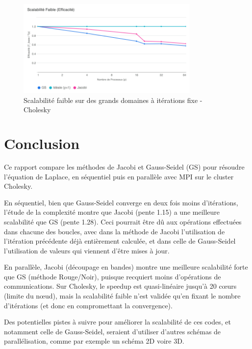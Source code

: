 \documentclass{article}
\begin{document}
\begin{figure}[H]
    \centering
    \includegraphics[width=0.8\textwidth]{Scalabilité_Faible_Efficacité_It}
    \caption{Scalabilité faible sur des grands domaines à itérations fixe - Cholesky}
    \label{fig:weakCholeskyBigIt}
\end{figure}

\section*{Conclusion}

Ce rapport compare les méthodes de Jacobi et Gauss-Seidel (GS) pour résoudre l'équation de Laplace, en séquentiel puis en parallèle avec MPI sur le cluster Cholesky.

En séquentiel, bien que Gauss-Seidel converge en deux fois moins d'itérations, l'étude de la complexité montre que Jacobi (pente 1.15) a une meilleure scalabilité que GS (pente 1.28). Ceci pourrait être dû aux opérations effectuées dans chacune des boucles, avec dans la méthode de Jacobi l'utilisation de l'itération précédente déjà entièrement calculée, et dans celle de Gauss-Seidel l'utilisation de valeurs qui viennent d'être mises à jour.

En parallèle, Jacobi (découpage en bandes) montre une meilleure scalabilité forte que GS (méthode Rouge/Noir), puisque recquiert moins d'opérations de communications. Sur Cholesky, le speedup est quasi-linéaire jusqu'à 20 cœurs (limite du nœud), mais la scalabilité faible n'est validée qu'en fixant le nombre d'itérations (et donc en compromettant la convergence).

Des potentielles pistes à suivre pour améliorer la scalabilité de ces codes, et notamment celle de Gauss-Seidel, seraient d'utiliser d'autres schémas de parallélisation, comme par exemple un schéma 2D voire 3D.
\end{document}
